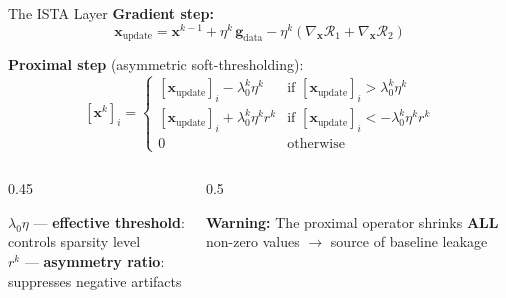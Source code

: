 \documentclass[aspectratio=169, 10pt]{beamer}
\begin{document}
\begin{frame}{The ISTA Layer}
\textbf{Gradient step:}
\[
\mathbf{x}_{\text{update}} = \mathbf{x}^{k-1} + \eta^k \,\mathbf{g}_{\text{data}} - \eta^k\!\left(\nabla_{\mathbf{x}}\mathcal{R}_1 + \nabla_{\mathbf{x}}\mathcal{R}_2\right)
\]

\textbf{Proximal step} (asymmetric soft-thresholding):
\[
[\mathbf{x}^k]_i = \begin{cases}
[\mathbf{x}_{\text{update}}]_i - \lambda_0^k\eta^k & \text{if } [\mathbf{x}_{\text{update}}]_i > \lambda_0^k\eta^k \\[2pt]
[\mathbf{x}_{\text{update}}]_i + \lambda_0^k\eta^k r^k & \text{if } [\mathbf{x}_{\text{update}}]_i < -\lambda_0^k\eta^k r^k \\[2pt]
0 & \text{otherwise}
\end{cases}
\]

\vspace{0.5em}
\begin{columns}[T]
\begin{column}{0.45\textwidth}
\begin{insightbox}
$\lambda_0\eta$ --- \textbf{effective threshold}: controls sparsity level\\[3pt]
$r^k$ --- \textbf{asymmetry ratio}: suppresses negative artifacts
\end{insightbox}
\end{column}
\begin{column}{0.5\textwidth}
\begin{resultbad}
\textbf{Warning:} The proximal operator shrinks \textbf{ALL} non-zero values $\rightarrow$ source of baseline leakage
\end{resultbad}
\end{column}
\end{columns}
\end{frame}
\end{document}
